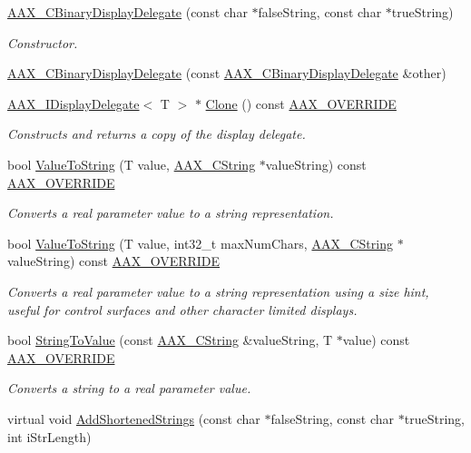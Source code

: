\begin{DoxyCompactItemize}
\item 
\mbox{\hyperlink{a01449_a7261174f82f961b2573bfbf334ed064c}{A\+A\+X\+\_\+\+C\+Binary\+Display\+Delegate}} (const char $\ast$false\+String, const char $\ast$true\+String)
\begin{DoxyCompactList}\small\item\em Constructor. \end{DoxyCompactList}\item 
\mbox{\hyperlink{a01449_a5b7d4d97d370445390d5d79218d868d9}{A\+A\+X\+\_\+\+C\+Binary\+Display\+Delegate}} (const \mbox{\hyperlink{a01449}{A\+A\+X\+\_\+\+C\+Binary\+Display\+Delegate}} \&other)
\item 
\mbox{\hyperlink{a01801}{A\+A\+X\+\_\+\+I\+Display\+Delegate}}$<$ T $>$ $\ast$ \mbox{\hyperlink{a01449_ac0f060429501b13e2f79babbcfdda9ab}{Clone}} () const \mbox{\hyperlink{a00392_ac2f24a5172689ae684344abdcce55463}{A\+A\+X\+\_\+\+O\+V\+E\+R\+R\+I\+DE}}
\begin{DoxyCompactList}\small\item\em Constructs and returns a copy of the display delegate. \end{DoxyCompactList}\item 
bool \mbox{\hyperlink{a01449_a37fc0647f758a9ff0d47595ba110ecdd}{Value\+To\+String}} (T value, \mbox{\hyperlink{a01573}{A\+A\+X\+\_\+\+C\+String}} $\ast$value\+String) const \mbox{\hyperlink{a00392_ac2f24a5172689ae684344abdcce55463}{A\+A\+X\+\_\+\+O\+V\+E\+R\+R\+I\+DE}}
\begin{DoxyCompactList}\small\item\em Converts a real parameter value to a string representation. \end{DoxyCompactList}\item 
bool \mbox{\hyperlink{a01449_ad499fa03159aec7df8da1be67aae82c7}{Value\+To\+String}} (T value, int32\+\_\+t max\+Num\+Chars, \mbox{\hyperlink{a01573}{A\+A\+X\+\_\+\+C\+String}} $\ast$value\+String) const \mbox{\hyperlink{a00392_ac2f24a5172689ae684344abdcce55463}{A\+A\+X\+\_\+\+O\+V\+E\+R\+R\+I\+DE}}
\begin{DoxyCompactList}\small\item\em Converts a real parameter value to a string representation using a size hint, useful for control surfaces and other character limited displays. \end{DoxyCompactList}\item 
bool \mbox{\hyperlink{a01449_ac707b7ca0e5fafdc4133959d8b7c5035}{String\+To\+Value}} (const \mbox{\hyperlink{a01573}{A\+A\+X\+\_\+\+C\+String}} \&value\+String, T $\ast$value) const \mbox{\hyperlink{a00392_ac2f24a5172689ae684344abdcce55463}{A\+A\+X\+\_\+\+O\+V\+E\+R\+R\+I\+DE}}
\begin{DoxyCompactList}\small\item\em Converts a string to a real parameter value. \end{DoxyCompactList}\item 
virtual void \mbox{\hyperlink{a01449_a3e6702d7c53a7f0a0f29ecf1ecd4b9b7}{Add\+Shortened\+Strings}} (const char $\ast$false\+String, const char $\ast$true\+String, int i\+Str\+Length)
\end{DoxyCompactItemize}


